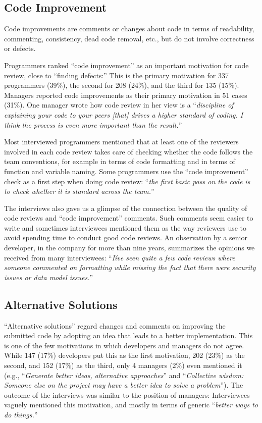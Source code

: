 \documentclass[conference]{IEEEtran}
\renewcommand{\quotation}[1]{``\emph{#1}''}
\begin{document}
\subsection{Code Improvement}

Code improvements are comments or changes about code in terms of readability,
commenting, consistency, dead code removal, etc., but do not involve
correctness or defects.

Programmers ranked ``code improvement'' as an important motivation for code
review, close to ``finding defects:'' This is the primary motivation for 337
programmers (39\%), the second for 208 (24\%), and the third for 135 (15\%).
Managers reported code improvements as their primary motivation in 51 cases
(31\%). One manager wrote how code review in her view is a
\quotation{discipline of explaining your code to your peers [that] drives a
higher standard of coding. I think the process is even more important than the
result.}

Most interviewed programmers mentioned that at least one of the reviewers
involved in each code review takes care of checking whether the code follows
the team conventions, for example in terms of code formatting and in terms of
function and variable naming. Some programmers use the ``code improvement''
check as a first step when doing code review: \quotation{the first basic pass
on the code is to check whether it is standard across the team.}

The interviews also gave us a glimpse of the connection between the quality of
code reviews and ``code improvement'' comments. Such comments seem easier to
write and sometimes interviewees mentioned them as the way reviewers use to
avoid spending time to conduct good code reviews. An observation by a senior
developer, in the company for more than nine years, summarizes the opinions we
received from many interviewees: \quotation{Iíve seen quite a few code reviews
where someone commented on formatting while missing the fact that there were
security issues or data model issues.}

\subsection{Alternative Solutions}

``Alternative solutions'' regard changes and comments on improving the
submitted code by adopting an idea that leads to a better implementation. This
is one of the few motivations in which developers and managers do not agree.
While 147 (17\%) developers put this as the first motivation, 202 (23\%) as the
second, and 152 (17\%) as the third, only 4 managers (2\%) even mentioned it
(e.g., \quotation{Generate better ideas, alternative approaches} and
\quotation{Collective wisdom: Someone else on the project may have a better
idea to solve a problem}). The outcome of the interviews was similar to the
position of managers: Interviewees vaguely mentioned this motivation, and
mostly in terms of generic \quotation{better ways to do things.}
\end{document}
